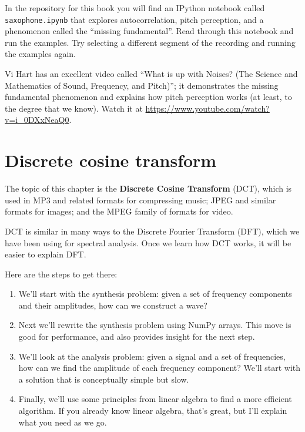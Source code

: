 \documentclass[12pt]{book}
\begin{document}
\begin{exercise}
In the repository for this book you will find an IPython notebook
called \verb"saxophone.ipynb" that explores autocorrelation,
pitch perception, and a phenomenon called the ``missing fundamental''.
Read through this notebook and run the examples.  Try selecting
a different segment of the recording and running the examples again.

Vi Hart has an excellent video called ``What is up with Noises? (The
Science and Mathematics of Sound, Frequency, and Pitch)''; it
demonstrates the missing fundamental phenomenon and explains how pitch
perception works (at least, to the degree that we know).  Watch it at
\url{https://www.youtube.com/watch?v=i_0DXxNeaQ0}.



\end{exercise}



\chapter{Discrete cosine transform}
\label{dct}

The topic of this chapter is the {\bf Discrete Cosine
  Transform} (DCT), which is used in MP3 and related formats for
compressing music; JPEG and similar formats for images; and the MPEG
family of formats for video.

DCT is similar in many ways to the Discrete Fourier Transform (DFT),
which we have been using for spectral analysis.
Once we learn how DCT works, it will be easier to explain DFT.

Here are the steps to get there:

\begin{enumerate}

\item We'll start with the synthesis problem: given a set of frequency
  components and their amplitudes, how can we construct a wave?

\item Next we'll rewrite the synthesis problem using NumPy arrays.
  This move is good for performance, and also provides insight
  for the next step.

\item We'll look at the analysis problem: given a signal and a
  set of frequencies, how can we find the amplitude of each frequency
  component?  We'll start with a solution that is conceptually simple
  but slow.

\item Finally, we'll use some principles from linear algebra to find a
  more efficient algorithm.  If you already know linear algebra,
  that's great, but I'll explain what you need as we go.

\end{enumerate}
\end{document}
